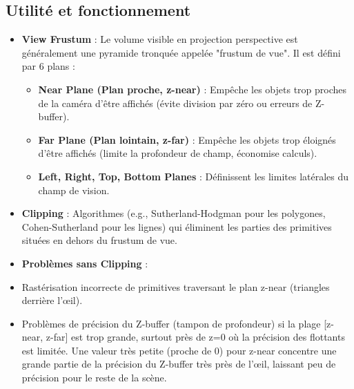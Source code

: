 \subsection{Utilité et fonctionnement}
\begin{itemize}
    \item \textbf{View Frustum} : Le volume visible en projection perspective est généralement une pyramide tronquée appelée "frustum de vue". Il est défini par 6 plans :
        \begin{itemize}
            \item \textbf{Near Plane (Plan proche, z-near)} : Empêche les objets trop proches de la caméra d'être affichés (évite division par zéro ou erreurs de Z-buffer).
            \item \textbf{Far Plane (Plan lointain, z-far)} : Empêche les objets trop éloignés d'être affichés (limite la profondeur de champ, économise calculs).
            \item \textbf{Left, Right, Top, Bottom Planes} : Définissent les limites latérales du champ de vision.
        \end{itemize}
    \item \textbf{Clipping} : Algorithmes (e.g., Sutherland-Hodgman pour les polygones, Cohen-Sutherland pour les lignes) qui éliminent les parties des primitives situées en dehors du frustum de vue.
    \item \textbf{Problèmes sans Clipping} :
        \item Rastérisation incorrecte de primitives traversant le plan z-near (triangles derrière l'œil).
        \item Problèmes de précision du Z-buffer (tampon de profondeur) si la plage [z-near, z-far] est trop grande, surtout près de z=0 où la précision des flottants est limitée. Une valeur très petite (proche de 0) pour z-near concentre une grande partie de la précision du Z-buffer très près de l'œil, laissant peu de précision pour le reste de la scène.
\end{itemize}
